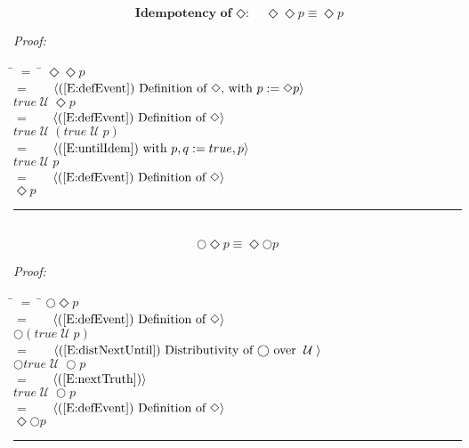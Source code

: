 \documentclass[fleqn, leqno]{article}
\newcommand{\lgap}{2pt}                             %
\newcommand{\mymathindent}{24pt}                      %
\newcommand{\myqed}{\hfill\rule[-.23ex]{1.2ex}{2.0ex}}
\newcommand{\until}{\;\mathcal{U}\;}
\newcommand{\Gll} {\langle}                         %
\newcommand{\Ggg} {\rangle}                         %
\newcommand{\Hint}[1]     {\ \ \ $\Gll              \mbox{#1} \Ggg$ }   %
\begin{document}
\begin{equation}\label{E:IdemEvent}
\textbf{Idempotency of $\Diamond$:}\quad \Diamond\Diamond p \equiv \Diamond p
\end{equation}

\emph{Proof:}
\begin{tabbing}
\hspace{\mymathindent} \= $= \;$ \= \kill
  \> \>   $\Diamond\Diamond p$\\[\lgap]
  \> $=$  \>  \Hint{(\ref{E:defEvent}) Definition of $\Diamond$, with $p := \Diamond p$}\\[\lgap]
  \> \>   $true \until \Diamond p$\\[\lgap]
  \> $=$  \>  \Hint{(\ref{E:defEvent}) Definition of $\Diamond$}\\[\lgap]
  \> \>   $true \until (true \until p)$\\[\lgap]
  \> $=$  \>  \Hint{(\ref{E:untilIdem}) with $p,q := true,p$}\\[\lgap]
  \> \>   $true \until p$\\[\lgap]
  \> $=$  \>  \Hint{(\ref{E:defEvent}) Definition of $\Diamond$}\\[\lgap]
  \> \>   $\Diamond p$\\[\lgap]
\end{tabbing}
\myqed\\[\lgap]


\begin{equation}\label{E:dNextEvent}
\bigcirc\Diamond p \equiv \Diamond\bigcirc p
\end{equation}

\emph{Proof:}
\begin{tabbing}
\hspace{\mymathindent} \= $= \;$ \= \kill
  \> \>   $\bigcirc\Diamond p$\\[\lgap]
  \> $=$  \>  \Hint{(\ref{E:defEvent}) Definition of $\Diamond$}\\[\lgap]
  \> \>   $\bigcirc(true \until p)$\\[\lgap]
  \> $=$  \>  \Hint{(\ref{E:distNextUntil}) Distributivity of $\bigcirc$ over $\until$}\\[\lgap]
  \> \>   $\bigcirc true \until \bigcirc p$\\[\lgap]
  \> $=$  \>  \Hint{(\ref{E:nextTruth})}\\[\lgap]
  \> \>   $true \until \bigcirc p$\\[\lgap]
  \> $=$  \>  \Hint{(\ref{E:defEvent}) Definition of $\Diamond$}\\[\lgap]
  \> \>   $\Diamond\bigcirc p$\\[\lgap]
\end{tabbing}
\myqed\\[\lgap]
\end{document}
